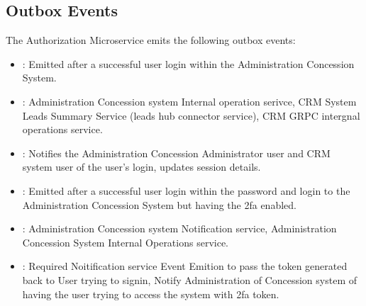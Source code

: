 \documentclass[letterpaper,10pt,english]{sphinxmanual}
\begin{document}
\subsection{Outbox Events}
\label{\detokenize{crm_system/authorization_service:outbox-events}}
\sphinxAtStartPar
The Authorization Microservice emits the following outbox events:

\sphinxAtStartPar
{}
\begin{itemize}
\item {} 
\sphinxAtStartPar
{}: Emitted after a successful user login within the Administration Concession System.

\item {} 
\sphinxAtStartPar
{}: Administration Concession system Internal operation serivce, CRM System Leads Summary Service (leads hub connector service), CRM GRPC intergnal operations service.

\item {} 
\sphinxAtStartPar
{}: Notifies the Administration Concession Administrator user and CRM system user of the user’s login, updates session details.

\end{itemize}

\sphinxAtStartPar
{}
\begin{itemize}
\item {} 
\sphinxAtStartPar
{}: Emitted after a successful user login within the password and login to  the Administration Concession System but having the 2fa enabled.

\item {} 
\sphinxAtStartPar
{}: Administration Concession system Notification service, Administration Concession System Internal Operations service.

\item {} 
\sphinxAtStartPar
{}: Required Noitification service Event Emition to pass the token generated back to User trying to sign\sphinxhyphen{}in, Notify Administration of Concession system of having the user trying to access the system with 2fa token.

\end{itemize}
\end{document}

